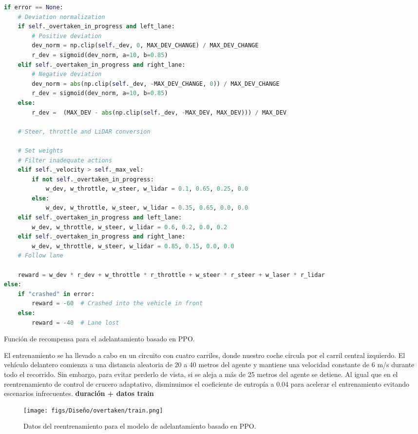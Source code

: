 \begin{code}[H]
\begin{lstlisting}[language=Python]
if error == None:
    # Deviation normalization
    if self._overtaken_in_progress and left_lane:
        # Positive deviation
        dev_norm = np.clip(self._dev, 0, MAX_DEV_CHANGE) / MAX_DEV_CHANGE
        r_dev = sigmoid(dev_norm, a=10, b=0.85)
    elif self._overtaken_in_progress and right_lane:
        # Negative deviation 
        dev_norm = abs(np.clip(self._dev, -MAX_DEV_CHANGE, 0)) / MAX_DEV_CHANGE
        r_dev = sigmoid(dev_norm, a=10, b=0.85)
    else:
        r_dev =  (MAX_DEV - abs(np.clip(self._dev, -MAX_DEV, MAX_DEV))) / MAX_DEV

    # Steer, throttle and LiDAR conversion

    # Set weights
    # Filter inadequate actions
    elif self._velocity > self._max_vel:
        if not self._overtaken_in_progress:
            w_dev, w_throttle, w_steer, w_lidar = 0.1, 0.65, 0.25, 0.0
        else:
            w_dev, w_throttle, w_steer, w_lidar = 0.35, 0.65, 0.0, 0.0
    elif self._overtaken_in_progress and left_lane:
        w_dev, w_throttle, w_steer, w_lidar = 0.6, 0.2, 0.0, 0.2
    elif self._overtaken_in_progress and right_lane:
        w_dev, w_throttle, w_steer, w_lidar = 0.85, 0.15, 0.0, 0.0  
    # Follow lane

    reward = w_dev * r_dev + w_throttle * r_throttle + w_steer * r_steer + w_laser * r_lidar
else:
    if "crashed" in error:
        reward = -60  # Crashed into the vehicle in front
    else:
        reward = -40  # Lane lost
\end{lstlisting}
\caption[Función de recompensa para el adelantamiento basado en \ac{PPO}]{Función de recompensa para el adelantamiento basado en \ac{PPO}.}
\label{cod:rew_ppo_overtaken}
\end{code}

El entrenamiento se ha llevado a cabo en un circuito con cuatro carriles, donde nuestro coche circula por el carril central izquierdo. El vehículo delantero comienza a una distancia aleatoria de 20 a 40 metros del agente y mantiene una velocidad constante de 6 m/s durante todo el recorrido. Sin embargo, para evitar perderlo de vista, si se aleja a más de 25 metros del agente se detiene. Al igual que en el reentrenamiento de control de crucero adaptativo, disminuimos el coeficiente de entropía a 0.04 para acelerar el entrenamiento evitando escenarios infrecuentes. \textbf{duración + datos train}
\begin{figure}[ht]
\centering
\texttt{[image: figs/Diseño/overtaken/train.png]}
\caption{Datos del reentrenamiento para el modelo de adelantamiento basado en \ac{PPO}.}
\label{fig:train_overtaken}
\end{figure}

